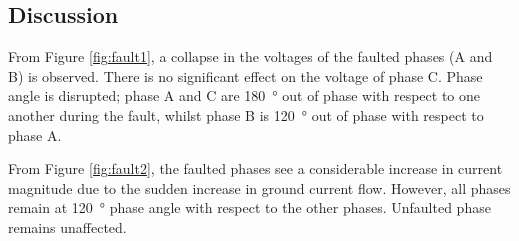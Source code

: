 \subsection{Discussion}
From Figure \ref{fig:fault1}, a collapse in the voltages of the faulted phases (A and B) is observed. There is no significant effect on the voltage of phase C. Phase angle is disrupted; phase A and C are \SI{180}{\degree} out of phase with respect to one another during the fault, whilst phase B is \SI{120}{\degree} out of phase with respect to phase A.

From Figure \ref{fig:fault2}, the faulted phases see a considerable increase in current magnitude due to the sudden increase in ground current flow. However, all phases remain at \SI{120}{\degree} phase angle with respect to the other phases. Unfaulted phase remains unaffected.